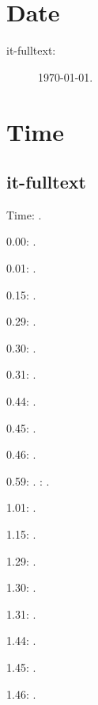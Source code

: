 \documentclass[italian]{article}
\begin{document}
\section{Date}

\begin{description}
\item[it-fulltext:]
\today.


\end{description}

\section{Time}
\subsection{it-fulltext}
Time: \DTMcurrenttime.

0.00:  .

0.01:   . 

0.15:   . 

0.29:   . 

0.30:   .

0.31:   .

0.44:   .

0.45:   .

0.46:   .

0.59:   .
:  .

1.01:   . 

1.15:   . 

1.29:   . 

1.30:   .

1.31:   .

1.44:   .

1.45:   .

1.46:   .
\end{document}
